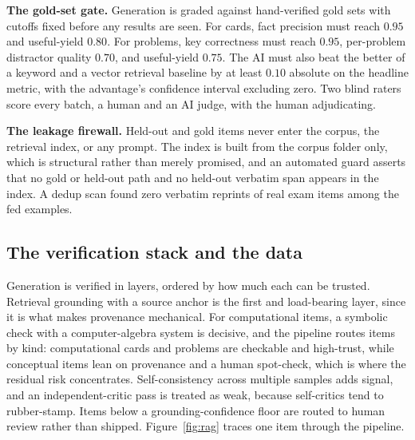 \documentclass[11pt]{article}
\begin{document}
\textbf{The gold-set gate.} Generation is graded against hand-verified gold sets with
cutoffs fixed before any results are seen. For cards, fact precision must reach
$0.95$ and useful-yield $0.80$. For problems, key correctness must reach $0.95$,
per-problem distractor quality $0.70$, and useful-yield $0.75$. The AI must also beat
the better of a keyword and a vector retrieval baseline by at least $0.10$ absolute
on the headline metric, with the advantage's confidence interval excluding zero. Two
blind raters score every batch, a human and an AI judge, with the human adjudicating.

\textbf{The leakage firewall.} Held-out and gold items never enter the corpus, the
retrieval index, or any prompt. The index is built from the corpus folder only, which
is structural rather than merely promised, and an automated guard asserts that no
gold or held-out path and no held-out verbatim span appears in the index. A dedup
scan found zero verbatim reprints of real exam items among the fed examples.

\subsection{The verification stack and the data}

Generation is verified in layers, ordered by how much each can be trusted. Retrieval
grounding with a source anchor is the first and load-bearing layer, since it is what
makes provenance mechanical. For computational items, a symbolic check with a
computer-algebra system is decisive, and the pipeline routes items by kind:
computational cards and problems are checkable and high-trust, while conceptual items
lean on provenance and a human spot-check, which is where the residual risk
concentrates. Self-consistency across multiple samples adds signal, and an
independent-critic pass is treated as weak, because self-critics tend to rubber-stamp.
Items below a grounding-confidence floor are routed to human review rather than shipped.
Figure~\ref{fig:rag} traces one item through the pipeline.
\end{document}
